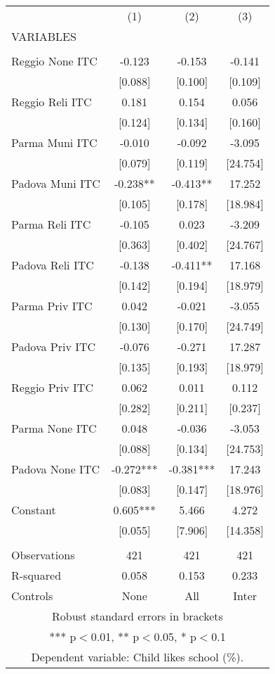\begin{tabular}{lccc} \hline
 & (1) & (2) & (3) \\
VARIABLES &  &  &  \\ \hline
 &  &  &  \\
Reggio None ITC & -0.123 & -0.153 & -0.141 \\
 & [0.088] & [0.100] & [0.109] \\
Reggio Reli ITC & 0.181 & 0.154 & 0.056 \\
 & [0.124] & [0.134] & [0.160] \\
Parma Muni ITC & -0.010 & -0.092 & -3.095 \\
 & [0.079] & [0.119] & [24.754] \\
Padova Muni ITC & -0.238** & -0.413** & 17.252 \\
 & [0.105] & [0.178] & [18.984] \\
Parma Reli ITC & -0.105 & 0.023 & -3.209 \\
 & [0.363] & [0.402] & [24.767] \\
Padova Reli ITC & -0.138 & -0.411** & 17.168 \\
 & [0.142] & [0.194] & [18.979] \\
Parma Priv ITC & 0.042 & -0.021 & -3.055 \\
 & [0.130] & [0.170] & [24.749] \\
Padova Priv ITC & -0.076 & -0.271 & 17.287 \\
 & [0.135] & [0.193] & [18.979] \\
Reggio Priv ITC & 0.062 & 0.011 & 0.112 \\
 & [0.282] & [0.211] & [0.237] \\
Parma None ITC & 0.048 & -0.036 & -3.053 \\
 & [0.088] & [0.134] & [24.753] \\
Padova None ITC & -0.272*** & -0.381*** & 17.243 \\
 & [0.083] & [0.147] & [18.976] \\
Constant & 0.605*** & 5.466 & 4.272 \\
 & [0.055] & [7.906] & [14.358] \\
 &  &  &  \\
Observations & 421 & 421 & 421 \\
R-squared & 0.058 & 0.153 & 0.233 \\
 Controls & None & All & Inter \\ \hline
\multicolumn{4}{c}{ Robust standard errors in brackets} \\
\multicolumn{4}{c}{ *** p$<$0.01, ** p$<$0.05, * p$<$0.1} \\
\multicolumn{4}{c}{ Dependent variable: Child likes school (\%).} \\
\end{tabular}
